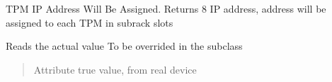 \documentclass[letterpaper,10pt,english]{sphinxmanual}
\begin{document}
\begin{fulllineitems}
\label{\detokenize{webserverdocs:subrack_hardware.TPM_Add_List}}
\pysigstartsignatures
{}
\pysigstopsignatures
\sphinxAtStartPar
TPM IP Address Will Be Assigned.
Returns 8 IP address, address will be assigned to each TPM in subrack slots

\begin{fulllineitems}
\label{\detokenize{webserverdocs:subrack_hardware.TPM_Add_List.read_value}}
\pysigstartsignatures
{}
\pysigstopsignatures
\sphinxAtStartPar
Reads the actual value
To be overrided in the subclass
\begin{quote}\begin{description}
\sphinxAtStartPar
Attribute true value, from real device

\end{description}\end{quote}

\end{fulllineitems}


\end{fulllineitems}

\end{document}
